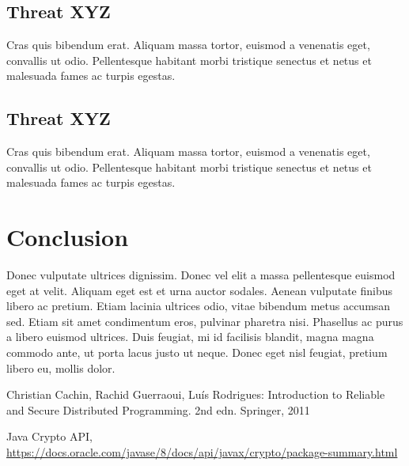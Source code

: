 \documentclass[runningheads]{llncs}
\begin{document}
\subsection{Threat XYZ}
Cras quis bibendum erat. Aliquam massa tortor, euismod a venenatis eget,
convallis ut odio. Pellentesque habitant morbi tristique senectus et netus et
malesuada fames ac turpis egestas.
%
\subsection{Threat XYZ}
Cras quis bibendum erat. Aliquam massa tortor, euismod a venenatis eget,
convallis ut odio. Pellentesque habitant morbi tristique senectus et netus et
malesuada fames ac turpis egestas.
%
\section{Conclusion}
Donec vulputate ultrices dignissim. Donec vel elit a massa pellentesque euismod
eget at velit. Aliquam eget est et urna auctor sodales. Aenean vulputate finibus
libero ac pretium. Etiam lacinia ultrices odio, vitae bibendum metus accumsan
sed. Etiam sit amet condimentum eros, pulvinar pharetra nisi. Phasellus ac purus
a libero euismod ultrices. Duis feugiat, mi id facilisis blandit, magna magna
commodo ante, ut porta lacus justo ut neque. Donec eget nisl feugiat, pretium
libero eu, mollis dolor.

\begin{thebibliography}{8}

Christian Cachin, Rachid Guerraoui, Luís Rodrigues: Introduction to Reliable and
Secure Distributed Programming. 2nd edn. Springer, 2011

Java Crypto API,
\url{https://docs.oracle.com/javase/8/docs/api/javax/crypto/package-summary.html}
\end{thebibliography}
\end{document}
